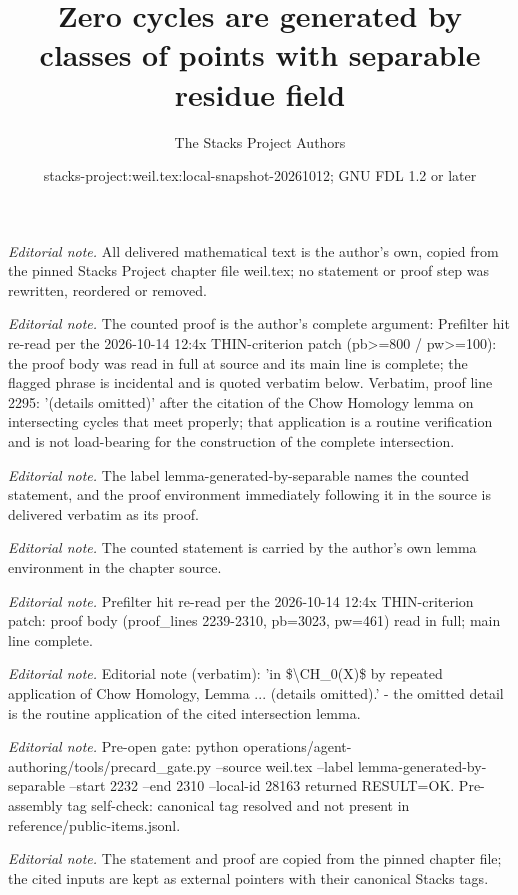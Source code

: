 \documentclass[10pt,a4paper]{amsart}
\title{Zero cycles are generated by classes of points with separable residue field}
\author{The Stacks Project Authors}
\date{stacks-project:weil.tex:local-snapshot-20261012; GNU FDL 1.2 or later}
\theoremstyle{plain}
\theoremstyle{definition}
\theoremstyle{remark}
\numberwithin{equation}{subsection}
\begin{document}
\maketitle
\noindent\textit{Editorial note.} All delivered mathematical text is the author's own, copied from the pinned Stacks Project chapter file weil.tex; no statement or proof step was rewritten, reordered or removed.\par\medskip
\noindent\textit{Editorial note.} The counted proof is the author's complete argument: Prefilter hit re-read per the 2026-10-14 12:4x THIN-criterion patch (pb>=800 / pw>=100): the proof body was read in full at source and its main line is complete; the flagged phrase is incidental and is quoted verbatim below. Verbatim, proof line 2295: '(details omitted)' after the citation of the Chow Homology lemma on intersecting cycles that meet properly; that application is a routine verification and is not load-bearing for the construction of the complete intersection.\par\medskip
\noindent\textit{Editorial note.} The label lemma-generated-by-separable names the counted statement, and the proof environment immediately following it in the source is delivered verbatim as its proof.\par\medskip
\noindent\textit{Editorial note.} The counted statement is carried by the author's own lemma environment in the chapter source.\par\medskip
\noindent\textit{Editorial note.} Prefilter hit re-read per the 2026-10-14 12:4x THIN-criterion patch: proof body (proof\_lines 2239-2310, pb=3023, pw=461) read in full; main line complete.\par\medskip
\noindent\textit{Editorial note.} Editorial note (verbatim): 'in \$\textbackslash{}CH\_0(X)\$ by repeated application of Chow Homology, Lemma ... (details omitted).'  -  the omitted detail is the routine application of the cited intersection lemma.\par\medskip
\noindent\textit{Editorial note.} Pre-open gate: python operations/agent-authoring/tools/precard\_gate.py --source weil.tex --label lemma-generated-by-separable --start 2232 --end 2310 --local-id 28163 returned RESULT=OK. Pre-assembly tag self-check: canonical tag resolved and not present in reference/public-items.jsonl.\par\medskip
\noindent\textit{Editorial note.} The statement and proof are copied from the pinned chapter file; the cited inputs are kept as external pointers with their canonical Stacks tags.\par\medskip
\end{document}
